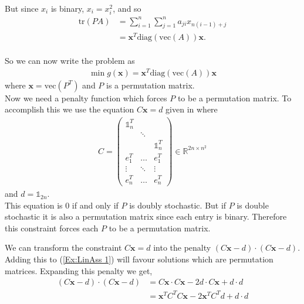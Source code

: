 \documentclass{article}
\begin{document}
But since \(x_i\) is binary, \(x_i = x_i^2\), and so 
\begin{align*}
    \text{tr}(PA) &= \sum_{i=1}^{n} \sum_{j=1}^{n} a_{ji}x_{n(i-1)+j} \\
    &= \mathbf{x}^T \text{diag}(\text{vec}(A))\mathbf{x}.
\end{align*}\\
\noindent So we can now write the problem as 
\begin{align} \label{Ex:LinAss 1}
    \min g(\mathbf{x}) = \mathbf{x}^T \text{diag}(\text{vec}(A)) \mathbf{x}
\end{align}
where \(\mathbf{x} = \text{vec}(P^T)\) and \(P\) is a permutation matrix.\\

\noindent Now we need a penalty function which forces \(P\) to be a permutation matrix. To accomplish this we use the equation \(C\mathbf{x} = d\) given in \cite[p.~8]{klus2023continuous} where 
\begin{align*}
    C = \begin{pmatrix}
        \mathbb{1}_n^T & & \\
         & \ddots & \\ 
         & & \mathbb{1}_n^T \\
         e_1^T & \hdots & e_1^T \\
         \vdots & \ddots & \vdots \\
         e_n^T & \hdots & e_n^T
    \end{pmatrix} \in \mathbb{R}^{2n \times n^2}
\end{align*}
and \(d = \mathbb{1}_{2n}\). \\
This equation is 0 if and only if \(P\) is doubly stochastic. But if \(P\) is double stochastic it is also a permutation matrix since each entry is binary. Therefore this constraint forces each \(P\) to be a permutation matrix.

\newpage
\noindent We can transform the constraint \(C\mathbf{x} = d\) into the penalty \((C\mathbf{x} - d) \cdot (C\mathbf{x} - d)\). Adding this to (\ref{Ex:LinAss 1}) will favour solutions which are  permutation matrices.
Expanding this penalty we get,
\begin{align*}
    (C\mathbf{x} - d) \cdot (C\mathbf{x} - d) &= C\mathbf{x} \cdot C\mathbf{x} - 2d\cdot C\mathbf{x} + d \cdot d \\
    &= \mathbf{x}^T C^T C \mathbf{x} -2\mathbf{x}^T C^T d + d\cdot d
\end{align*}
\end{document}
